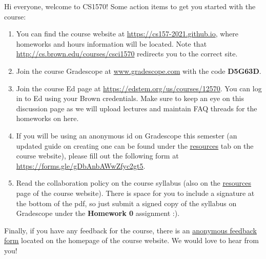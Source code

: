 \documentclass{common/cs157}
\begin{document}
Hi everyone, welcome to CS1570! Some action items to get you started with the course:
\begin{enumerate}[1.]
    \item You can find the course website at \url{https://cs157-2021.github.io}, where homeworks and hours information will be located. Note that \url{http://cs.brown.edu/courses/csci1570} redirects you to the correct site.
    \item Join the course Gradescope at \url{www.gradescope.com} with the code \textbf{D5G63D}.
    \item Join the course Ed page at \url{https://edstem.org/us/courses/12570}. You can log in to Ed using your Brown credentials. Make sure to keep an eye on this discussion page as we will upload lectures and maintain FAQ threads for the homeworks on here.
    \item If you will be using an anonymous id on Gradescope this semester (an updated guide on creating one can be found under the \underline{\href{https://cs157-2021.github.io/resources.html}{resources}} tab on the course website), please fill out the following form at \url{https://forms.gle/gDbAnbAWwZfyc2gt5}.
    \item Read the collaboration policy on the course syllabus (also on the \underline{\href{https://cs157-2021.github.io/resources.html}{resources}} page of the course website). There is space for you to include a signature at the bottom of the pdf, so just submit a signed copy of the syllabus on Gradescope under the \textbf{Homework 0} assignment :).
\end{enumerate}
Finally, if you have any feedback for the course, there is an \underline{\href{https://forms.gle/GQCHj9WdobTootCT7}{anonymous feedback form}} located on the homepage of the course website. We would love to hear from you!
\end{document}
